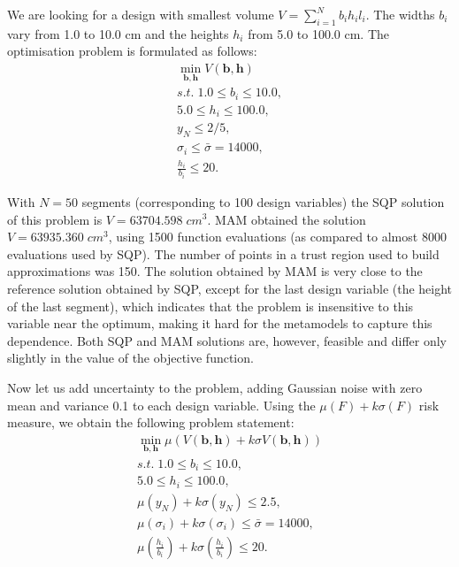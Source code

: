 \documentclass[10pt,twocolumn,a4paper]{article}
\begin{document}
We are looking for a design with smallest volume $V = \sum_{i=1}^N b_i h_i l_i$. The widths $b_i$ vary from 1.0 to 10.0 cm and the heights $h_i$ from 5.0 to 100.0 cm. The optimisation problem is formulated as follows:
\begin{displaymath}
  \begin{array}{c}
    \min\limits_{\pmb b, \pmb h}V(\pmb b, \pmb h) \\
    s.t.\;1.0\le b_i \le 10.0, \\
    5.0 \le h_i \le 100.0, \\
    y_N\le 2/5, \\
    \sigma_i \le \bar{\sigma}=14000, \\
    \frac{h_i}{b_i}\le 20.
  \end{array}
\end{displaymath}

With $N=50$ segments (corresponding to 100 design variables) the SQP solution of this problem is $V = 63704.598\; cm^3$. MAM obtained the solution $V = 63935.360\; cm^3$, using 1500 function evaluations (as compared to almost 8000 evaluations used by SQP). The number of points in a trust region used to build approximations was 150. The solution obtained by MAM is very close to the reference solution obtained by SQP, except for the last design variable (the height of the last segment), which indicates that the problem is insensitive to this variable near the optimum, making it hard for the metamodels to capture this dependence. Both SQP and MAM solutions are, however, feasible and differ only slightly in the value of the objective function.

Now let us add uncertainty to the problem, adding Gaussian noise with zero mean and variance 0.1 to each design variable. Using the $\mu(F) + k\sigma(F)$ risk measure, we obtain the following problem statement:
\begin{displaymath}
  \begin{array}{c}
    \min\limits_{\pmb b, \pmb h}\mu(V(\pmb b, \pmb h) + k\sigma V(\pmb b, \pmb h)) \\
    s.t.\;1.0\le b_i \le 10.0, \\
    5.0 \le h_i \le 100.0, \\
    \mu(y_N) + k\sigma(y_N)\le 2.5, \\
    \mu(\sigma_i)+k\sigma(\sigma_i)\le \bar{\sigma}=14000, \\
    \mu(\frac{h_i}{b_i})+k\sigma(\frac{h_i}{b_i})\le 20.
  \end{array}
\end{displaymath}
\end{document}
